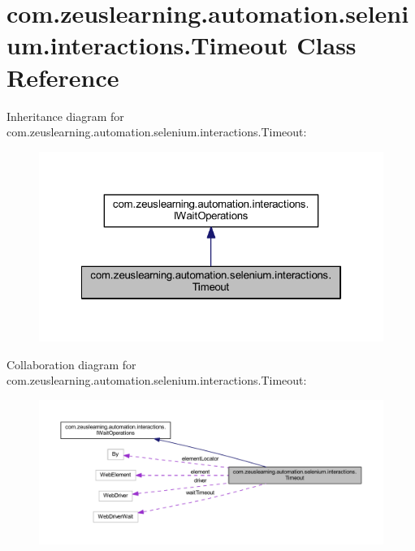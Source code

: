 \hypertarget{classcom_1_1zeuslearning_1_1automation_1_1selenium_1_1interactions_1_1Timeout}{}\section{com.\+zeuslearning.\+automation.\+selenium.\+interactions.\+Timeout Class Reference}
\label{classcom_1_1zeuslearning_1_1automation_1_1selenium_1_1interactions_1_1Timeout}


Inheritance diagram for com.\+zeuslearning.\+automation.\+selenium.\+interactions.\+Timeout\+:\nopagebreak
\begin{figure}[H]
\begin{center}
\leavevmode
\includegraphics[width=322pt]{dd/dd5/classcom_1_1zeuslearning_1_1automation_1_1selenium_1_1interactions_1_1Timeout__inherit__graph}
\end{center}
\end{figure}


Collaboration diagram for com.\+zeuslearning.\+automation.\+selenium.\+interactions.\+Timeout\+:
\nopagebreak
\begin{figure}[H]
\begin{center}
\leavevmode
\includegraphics[width=350pt]{de/d4e/classcom_1_1zeuslearning_1_1automation_1_1selenium_1_1interactions_1_1Timeout__coll__graph}
\end{center}
\end{figure}

